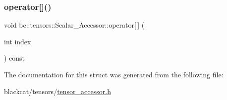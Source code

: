 \subsubsection{\texorpdfstring{operator[]()}{operator[]()}}
{\footnotesize\ttfamily void bc\+::tensors\+::\+Scalar\+\_\+\+Accessor\+::operator\mbox{[}$\,$\mbox{]} (\begin{DoxyParamCaption}\item[{int}]{index }\end{DoxyParamCaption}) const\hspace{0.3cm}{\ttfamily [inline]}}



The documentation for this struct was generated from the following file\+:\begin{DoxyCompactItemize}
\item 
blackcat/tensors/\hyperlink{tensor__accessor_8h}{tensor\+\_\+accessor.\+h}\end{DoxyCompactItemize}
